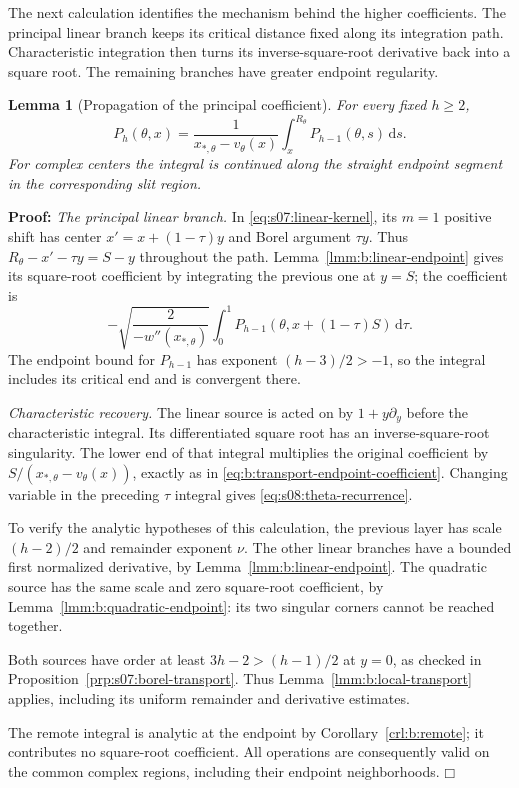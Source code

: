 \documentclass[a4paper,10pt]{article}
\numberwithin{equation}{section}
\newcommand{\dd}{\mathrm{d}}
\theoremstyle{paperplain}
\newtheorem{lmm}[thm]{Lemma}
\theoremstyle{paperremark}
\theoremstyle{paperplain}
\newenvironment{prf}{\noindent \textbf{Proof: }}{\hfill $\mdlgwhtsquare$\par\addvspace{0.5\baselineskip}}
\begin{document}
The next calculation identifies the mechanism behind the higher
coefficients. The principal linear branch keeps its critical
distance fixed along its integration path. Characteristic
integration then turns its inverse-square-root derivative back
into a square root. The remaining branches have greater endpoint
regularity.

\begin{lmm}[Propagation of the principal coefficient]\label{lmm:s08:propagation}
For every fixed $h\geq2$,
\begin{equation}\label{eq:s08:theta-recurrence}
 P_h(\theta,x)
 =\frac1{x_{*,\theta}-v_\theta(x)}
                         \int_x^{R_\theta}P_{h-1}(\theta,s)\,\dd s.
\end{equation}
For complex centers the integral is continued along the straight
endpoint segment in the corresponding slit region.
\end{lmm}
\begin{prf}
\emph{The principal linear branch.}
In \eqref{eq:s07:linear-kernel}, its $m=1$ positive shift has
center $x'=x+(1-\tau)y$ and Borel argument $\tau y$.
Thus $R_\theta-x'-\tau y=S-y$ throughout the path.
Lemma~\ref{lmm:b:linear-endpoint} gives its square-root coefficient
by integrating the previous one at $y=S$; the coefficient is
\[
 -\sqrt{\frac{2}{-w''(x_{*,\theta})}}
            \int_0^1P_{h-1}(\theta,x+(1-\tau)S)\,\dd\tau.
\]
The endpoint bound for $P_{h-1}$ has exponent $(h-3)/2>-1$, so
the integral includes its critical end and is convergent there.

\smallskip\noindent
\emph{Characteristic recovery.}
The linear source is acted on by $1+y\partial_y$ before the
characteristic integral. Its differentiated square root has an
inverse-square-root singularity. The lower end of that integral
multiplies the original coefficient by
$S/(x_{*,\theta}-v_\theta(x))$, exactly as in
\eqref{eq:b:transport-endpoint-coefficient}.
Changing variable in the preceding $\tau$ integral gives
\eqref{eq:s08:theta-recurrence}.

To verify the analytic hypotheses of this calculation, the previous
layer has scale $(h-2)/2$ and remainder exponent $\nu$.
The other linear branches have a bounded first normalized derivative,
by Lemma~\ref{lmm:b:linear-endpoint}. The quadratic source has the
same scale and zero square-root coefficient, by
Lemma~\ref{lmm:b:quadratic-endpoint}: its two singular corners
cannot be reached together.

Both sources have order at least
$3h-2>(h-1)/2$ at $y=0$, as checked in
Proposition~\ref{prp:s07:borel-transport}. Thus
Lemma~\ref{lmm:b:local-transport} applies, including its uniform
remainder and derivative estimates.

The remote integral is analytic
at the endpoint by Corollary~\ref{crl:b:remote}; it contributes no
square-root coefficient. All operations are consequently valid on
the common complex regions, including their endpoint neighborhoods.
\end{prf}
\end{document}
